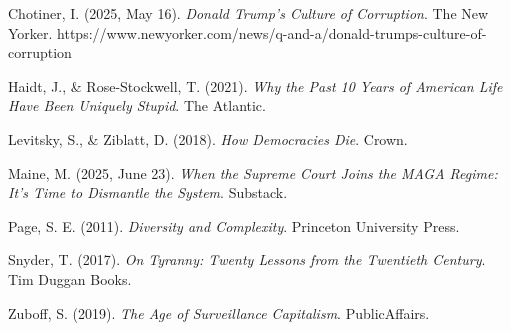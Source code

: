 Chotiner, I. (2025, May 16). \emph{Donald Trump's Culture of
Corruption}. The New Yorker.
https://www.newyorker.com/news/q-and-a/donald-trumps-culture-of-corruption

Haidt, J., \& Rose-Stockwell, T. (2021). \emph{Why the Past 10 Years of
American Life Have Been Uniquely Stupid}. The Atlantic.

Levitsky, S., \& Ziblatt, D. (2018). \emph{How Democracies Die}. Crown.

Maine, M. (2025, June 23). \emph{When the Supreme Court Joins the MAGA
Regime: It's Time to Dismantle the System}. Substack.

Page, S. E. (2011). \emph{Diversity and Complexity}. Princeton
University Press.

Snyder, T. (2017). \emph{On Tyranny: Twenty Lessons from the Twentieth
Century}. Tim Duggan Books.

Zuboff, S. (2019). \emph{The Age of Surveillance Capitalism}.
PublicAffairs.

